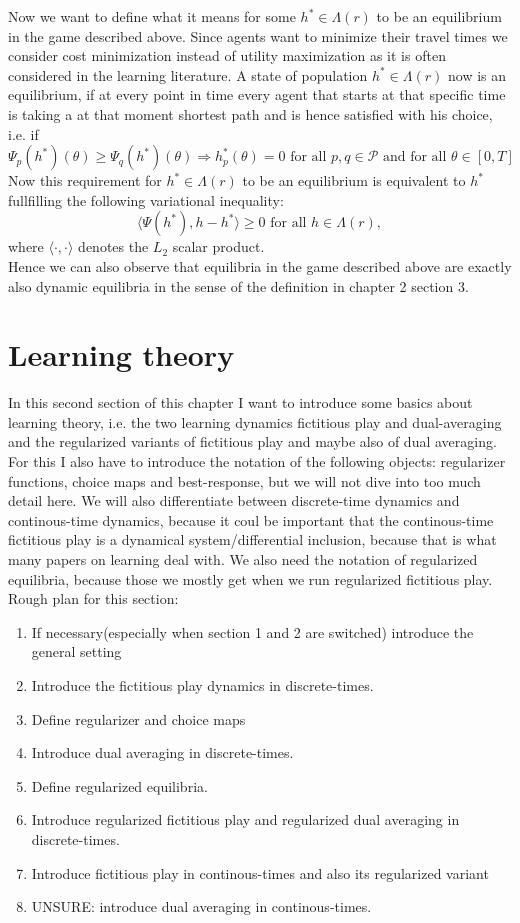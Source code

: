 \documentclass[reqno,openany]{amsbook}
\theoremstyle{definition}
\theoremstyle{plain}
\begin{document}
Now we want to define what it means for some $h^* \in \Lambda(r)$ to be an equilibrium in the game described above. Since agents want to minimize their travel times we consider cost minimization instead of utility maximization as it is often considered in the learning literature. A state of population $h^* \in \Lambda(r)$ now is an equilibrium, if at every point in time every agent that starts at that specific time is taking a at that moment shortest path and is hence satisfied with his choice, i.e. if 
\[ \Psi_p(h^*)(\theta) \geq \Psi_q(h^*)(\theta) \Rightarrow h_p^*(\theta) = 0  \text{  for all  } p, q \in \mathcal{P} \text{  and for all  } \theta \in [0, T] \]
Now this requirement for $h^* \in \Lambda(r)$ to be an equilibrium is equivalent to $h^*$ fullfilling the following variational inequality: 
\[ \langle \Psi(h^*) , h - h^* \rangle \geq 0 \text{  for all  } h \in \Lambda(r), \]
where $\langle \cdot, \cdot \rangle$ denotes the $L_2$ scalar product. \\
Hence we can also observe that equilibria in the game described above are exactly also dynamic equilibria in the sense of the definition in chapter 2 section 3.

\section{Learning theory}
In this second section of this chapter I want to introduce some basics about learning theory, i.e. the two learning dynamics fictitious play and dual-averaging and the regularized variants of fictitious play and maybe also of dual averaging. For this I also have to introduce the notation of the following objects: regularizer functions, choice maps and best-response, but we will not dive into too much detail here. We will also differentiate between discrete-time dynamics and continous-time dynamics, because it coul be important that the continous-time fictitious play is a dynamical system/differential inclusion, because that is what many papers on learning deal with. We also need the notation of regularized equilibria, because those we mostly get when we run regularized fictitious play.\\
Rough plan for this section:
\begin{enumerate}
	\item{If necessary(especially when section 1 and 2 are switched) introduce the general setting}
	\item{Introduce the fictitious play dynamics in discrete-times.}
	\item{Define regularizer and choice maps}
	\item{Introduce dual averaging in discrete-times.}
	\item{Define regularized equilibria.}
	\item{Introduce regularized fictitious play and regularized dual averaging in discrete-times.}
	\item{Introduce fictitious play in continous-times and also its regularized variant}
	\item{UNSURE: introduce dual averaging in continous-times.}
\end{enumerate}
\end{document}
